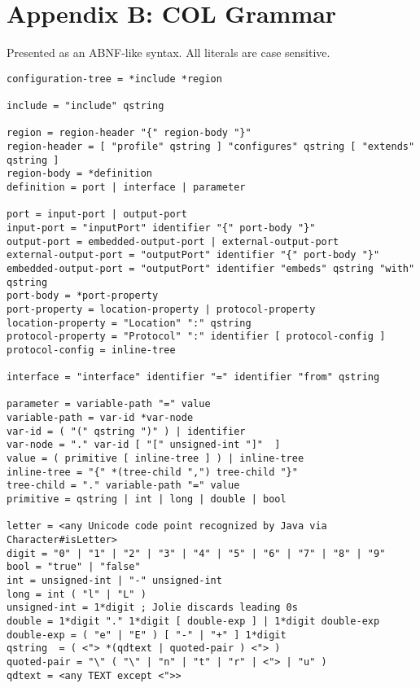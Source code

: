 \section{Appendix B: COL Grammar}\label{package-specification}

Presented as an ABNF-like syntax. All literals are case sensitive.

\begin{verbatim}
configuration-tree = *include *region

include = "include" qstring

region = region-header "{" region-body "}"
region-header = [ "profile" qstring ] "configures" qstring [ "extends" qstring ]
region-body = *definition
definition = port | interface | parameter

port = input-port | output-port
input-port = "inputPort" identifier "{" port-body "}"
output-port = embedded-output-port | external-output-port
external-output-port = "outputPort" identifier "{" port-body "}"
embedded-output-port = "outputPort" identifier "embeds" qstring "with" qstring
port-body = *port-property
port-property = location-property | protocol-property
location-property = "Location" ":" qstring
protocol-property = "Protocol" ":" identifier [ protocol-config ]
protocol-config = inline-tree

interface = "interface" identifier "=" identifier "from" qstring

parameter = variable-path "=" value
variable-path = var-id *var-node
var-id = ( "(" qstring ")" ) | identifier
var-node = "." var-id [ "[" unsigned-int "]"  ]
value = ( primitive [ inline-tree ] ) | inline-tree
inline-tree = "{" *(tree-child ",") tree-child "}"
tree-child = "." variable-path "=" value
primitive = qstring | int | long | double | bool

letter = <any Unicode code point recognized by Java via Character#isLetter>
digit = "0" | "1" | "2" | "3" | "4" | "5" | "6" | "7" | "8" | "9"
bool = "true" | "false"
int = unsigned-int | "-" unsigned-int
long = int ( "l" | "L" )
unsigned-int = 1*digit ; Jolie discards leading 0s
double = 1*digit "." 1*digit [ double-exp ] | 1*digit double-exp
double-exp = ( "e" | "E" ) [ "-" | "+" ] 1*digit
qstring  = ( <"> *(qdtext | quoted-pair ) <"> )
quoted-pair = "\" ( "\" | "n" | "t" | "r" | <"> | "u" )
qdtext = <any TEXT except <">>
\end{verbatim}
